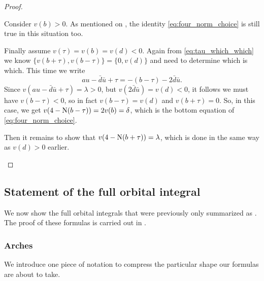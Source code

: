 \begin{proof}
\begin{itemize}
  \ii Consider $v(b) > 0$.
  As mentioned on \cite[p.\ 242]{ref:AFL}, the identity \eqref{eq:four_norm_choice}
  is still true in this situation too.

  \ii Finally assume $v(\tau) = v(b) = v(d) < 0$.
  Again from \eqref{eq:tau_which_which}
  we know $\{v(b+\tau), v(b-\tau)\} = \{0, v(d)\}$ and need to determine which is which.
  This time we write
  \[ au - \bar d \bar u + \tau = -(b - \tau) - 2 \bar d \bar u. \]
  Since $v(au - \bar d \bar u + \tau) = \lambda > 0$,
  but $v(2 \bar d \bar u) = v(d) < 0$,
  it follows we must have $v(b-\tau) < 0$,
  so in fact $v(b-\tau) = v(d)$ and $v(b+\tau) = 0$.
  So, in this case, we get $v(4 - \operatorname{N}(b-\tau)) = 2v(b) = \delta$,
  which is the bottom equation of \eqref{eq:four_norm_choice}.

  Then it remains to show that $v(4-\operatorname{N}(b+\tau)) = \lambda$,
  which is done in the same way as $v(d) > 0$ earlier.
  \qedhere
  \end{itemize}
\end{proof}
\subsection{Statement of the full orbital integral}
We now show the full orbital integrals that were previously only summarized as .
The proof of these formulas is carried out in .
\subsubsection{Arches}
We introduce one piece of notation to compress the particular shape our formulas are about to take.

